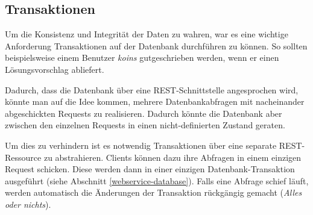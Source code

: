 \subsection{Transaktionen}
Um die Konsistenz und Integrität der Daten zu wahren, war es eine wichtige Anforderung Transaktionen auf der Datenbank durchführen zu können.
So sollten beispielsweise einem Benutzer \emph{koins} gutgeschrieben werden, wenn er einen Lösungsvorschlag abliefert.

Dadurch, dass die Datenbank über eine \gls{REST}-Schnittstelle angesprochen wird, könnte man auf die Idee kommen, mehrere Datenbankabfragen mit nacheinander abgeschickten Requests zu realisieren.
Dadurch könnte die Datenbank aber zwischen den einzelnen Requests in einen nicht-definierten Zustand geraten.

Um dies zu verhindern ist es notwendig Transaktionen über eine separate \gls{REST}-Ressource zu abstrahieren.
Clients können dazu ihre Abfragen in einem einzigen Request schicken. Diese werden dann in einer einzigen Datenbank-Transaktion ausgeführt (siehe Abschnitt \ref{webservice-database}).
Falls eine Abfrage schief läuft, werden automatisch die Änderungen der Transaktion rückgängig gemacht (\emph{Alles oder nichts}).